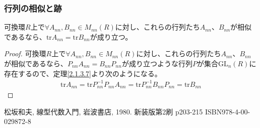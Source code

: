 \documentclass[dvipdfmx]{jsarticle}
\begin{document}
\subsubsection{行列の相似と跡}%
\begin{thm}\label{2.1.6.9}
可換環$R$上で$\forall A_{nn},B_{nn} \in M_{nn}(R)$に対し、これらの行列たち$A_{nn}$、$B_{nn}$が相似であるなら、${\mathrm{tr}}A_{nn} = {\mathrm{tr}}B_{nn}$が成り立つ。
\end{thm}
\begin{proof}
可換環$R$上で$\forall A_{nn},B_{nn} \in M_{nn}(R)$に対し、これらの行列たち$A_{nn}$、$B_{nn}$が相似であるなら、$P_{nn}A_{nn} = B_{nn}P_{nn}$が成り立つような行列$P$が集合${\mathrm{GL}}_{n}(R)$に存在するので、定理\ref{2.1.3.7}より次のようになる。
\begin{align*}
{\mathrm{tr}}A_{nn} = {\mathrm{tr}}{P_{nn}^{- 1}P_{nn}A_{nn}} = {\mathrm{tr}}{P_{nn}^{- 1}B_{nn}P_{nn}} = {\mathrm{tr}}B_{nn}
\end{align*}
\end{proof}
\begin{thebibliography}{50}
    松坂和夫, 線型代数入門, 岩波書店, 1980. 新装版第2刷 p203-215 ISBN978-4-00-029872-8
\end{thebibliography}
\end{document}
